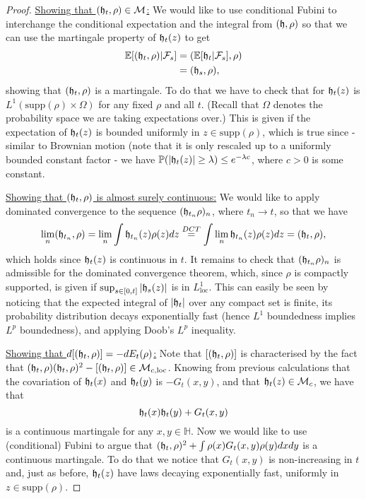 \documentclass[11pt,reqno]{amsart}
\numberwithin{equation}{section}
\newcommand{\eqby}[1]{\mathrel{\stackrel{#1}{=}}}
\newcommand{\fh}{{\frak h}}
\begin{document}
\begin{proof}
	\underline{Showing that $(\fh_t,\rho)\in\mathcal M$:} We would like to use conditional Fubini to interchange the conditional expectation and the integral from $(\fh,\rho)$ so that we can use the martingale property of $\fh_t(z)$ to get
		\begin{align*}
			\mathbb E[(\fh_t,\rho)|\mathcal F_s]&=(\mathbb E[\fh_t|\mathcal F_s],\rho)\\
			&=(\fh_s,\rho),
		\end{align*}
		showing that $(\fh_t,\rho)$ is a martingale. To do that we have to check that for $\fh_t(z)$ is $L^1(\text{supp}(\rho)\times\Omega)$ for any fixed $\rho$ and all $t$. (Recall that $\Omega$ denotes the probability space we are taking expectations over.)
		This is given if the expectation of $\fh_t(z)$ is bounded uniformly in $z\in\text{supp}(\rho)$, which is true since - similar to Brownian motion (note that it is only rescaled up to a uniformly bounded constant factor - we have $\mathbb P(|\fh_t(z)|\geq\lambda)\leq e^{-\lambda c}$, where $c>0$ is some constant.
	
	\underline{Showing that $(\fh_t,\rho)$ is almost surely continuous:} We would like to apply dominated convergence to the sequence $(\fh_{t_n}\rho)_n$, where $t_n\rightarrow t$, so that we have $$\lim_n (\fh_{t_n},\rho) = \lim_n\int \fh_{t_n}(z)\rho(z)dz \eqby{DCT} \int \lim_n\fh_{t_n}(z)\rho(z)dz = (\fh_t,\rho),$$
		which holds since $\fh_t(z)$ is continuous in $t$. It remains to check that $(\fh_{t_n}\rho)_n$ is admissible for the dominated convergence theorem, which, since $\rho$ is compactly supported, is given if $\sup_{s\in[0,t]}|\fh_s(z)|$ is in $L^1_\text{loc}$. This can easily be seen by noticing that the expected integral of $|\fh_t|$ over any compact set is finite, its probability distribution decays exponentially fast (hence $L^1$ boundedness implies $L^p$ boundedness), and applying Doob's $L^p$ inequality.
	
	\underline{Showing that $d[(\fh_t,\rho)]=-dE_t(\rho)$:} Note that $[(\fh_t,\rho)]$ is characterised by the fact that $(\fh_t,\rho)(\fh_t,\rho)^2-[(\fh_t,\rho)]\in\mathcal M_{c,\text{loc}}$. Knowing from previous calculations that the covariation of $\fh_t(x)$ and $\fh_t(y)$ is $-G_t(x,y)$, and that $\fh_t(z)\in\mathcal M_c$, we have that $$\fh_t(x)\fh_t(y)+G_t(x,y)$$ is a continuous martingale for any $x,y\in\mathbb H$. Now we would like to use (conditional) Fubini to argue that $(\fh_t,\rho)^2+\int \rho(x)G_t(x,y)\rho(y)dxdy$ is a continuous martingale. To do that we notice that $G_t(x,y)$ is non-increasing in $t$ and, just as before, $\fh_t(z)$ have laws decaying exponentially fast, uniformly in $z\in\text{supp}(\rho)$.
\end{proof}
\end{document}
